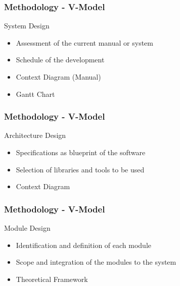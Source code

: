 \documentclass[handout]{beamer}
\begin{document}
\begin{frame}
	\frametitle{Methodology - V-Model}
	\begin{block}{System Design}
		\begin{itemize}
			\item<1-> Assessment of the current manual or system
			\item<2-> Schedule of the development
		\end{itemize}

		\begin{itemize}
			\item<3-> Context Diagram (Manual)
			\item<4-> Gantt Chart
		\end{itemize}
	\end{block}
\end{frame}

\begin{frame}
	\frametitle{Methodology - V-Model}
	\begin{block}{Architecture Design}
		\begin{itemize}
			\item<1-> Specifications as blueprint of the software
			\item<2-> Selection of libraries and tools to be used
		\end{itemize}

		\begin{itemize}
			\item<3-> Context Diagram
		\end{itemize}
	\end{block}
\end{frame}

\begin{frame}
	\frametitle{Methodology - V-Model}
	\begin{block}{Module Design}
		\begin{itemize}
			\item<1-> Identification and definition of each module
			\item<2-> Scope and integration of the modules to the system
		\end{itemize}

		\begin{itemize}
			\item<3-> Theoretical Framework
		\end{itemize}
	\end{block}
\end{frame}
\end{document}
